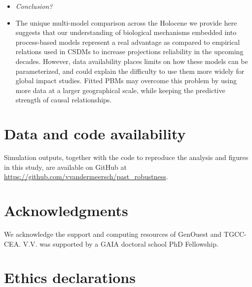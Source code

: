 \documentclass[pdflatex, sn-nature]{sn-jnl}%
\begin{document}
\begin{itemize}
\item \emph{Conclusion?}\par
\item The unique multi-model comparison across the Holocene we provide here suggests that our understanding of biological mechanisms embedded into process-based models represent a real advantage as compared to empirical relations used in CSDMs to increase projections reliability in the upcoming decades. However, data availability places limits on how these models can be parameterized, and could explain the difficulty to use them more widely for global impact studies. Fitted PBMs may overcome this problem by using more data at a larger geographical scale, while keeping the predictive strength of causal relationships.
\end{itemize}

\backmatter

\section*{Data and code availability}

Simulation outputs, together with the code to reproduce the analysis and figures in this study, are available on GitHub at \url{https://github.com/vvandermeersch/past_robustness}.

\section*{Acknowledgments}

We acknowledge the support and computing resources of GenOuest and TGCC-CEA. V.V. was supported by a GAIA doctoral school PhD Fellowship.

\section*{Ethics declarations}
\end{document}
